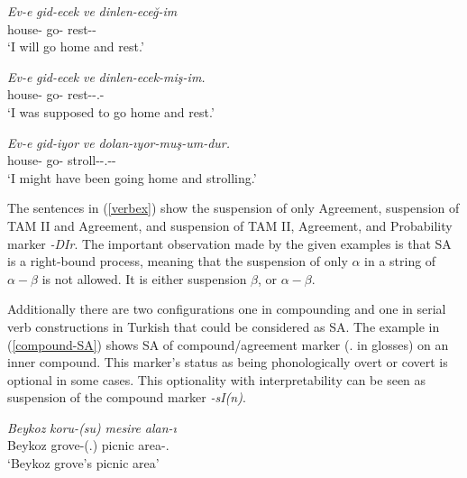 \begin{exe}
    \ex \label{verbex}
    \begin{xlist}
        \ex 
        \gll 
        \textit{Ev-e} \textit{gid-ecek} \textit{ve} \textit{dinlen-eceğ-im} \\ house-{\Dat} go-{\Fut} {\And} rest-{\Fut}-{\First}{\Sg} \\
        \glt `I will go home and rest.'
        
        \ex 
        \gll 
        \textit{Ev-e} \textit{gid-ecek} \textit{ve} \textit{dinlen-ecek-miş-im.} \\ house-{\Dat} go-{\Fut} {\And} rest-{\Fut}-{\Cop}.{\Evi}-{\First}{\Sg} \\
        \glt  `I was supposed to go home and rest.'
        
        \ex 
        \gll 
        \textit{Ev-e} \textit{gid-iyor} \textit{ve} \textit{dolan-ıyor-muş-um-dur.} \\ house-{\Dat} go-{\Fut} {\And} stroll-{\Prog}-{\Cop}.{\Evi}-{\First}{\Sg}-{\Prob} \\
        \glt `I might have been going home and strolling.'
    \end{xlist}
\end{exe}
The sentences in (\ref{verbex}) show the suspension of only Agreement, suspension of TAM II and Agreement, and suspension of TAM II, Agreement, and Probability marker \textit{-DIr}. The important observation made by the given examples is that SA is a right-bound process, meaning that the suspension of only $\alpha$ in a string of $\alpha-\beta$ is not allowed. It is either suspension $\beta$, or $\alpha-\beta$.

Additionally there are two configurations one in compounding and one in serial verb constructions in Turkish that could be considered as SA. The example in (\ref{compound-SA}) shows SA of compound/agreement marker ({\Third}{\Sg}.{\Poss} in glosses) on an inner compound. This marker's status as being phonologically overt or covert is optional in some cases. This optionality with interpretability can be seen as suspension of the compound marker \textit{-sI(n)}.

\begin{exe}
    \ex \label{compound-SA}
    \gll
    \textit{Beykoz} \textit{koru-(su)} \textit{mesire} \textit{alan-ı} \\ Beykoz grove-({\Third}{\Sg}.{\Poss}) picnic area-{\Third}{\Sg}.{\Poss} \\
    \glt `Beykoz grove's picnic area'
 \end{exe}
 
